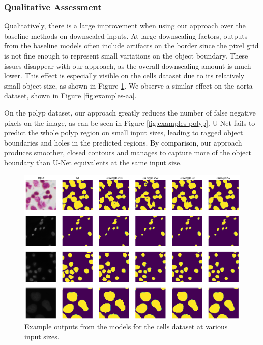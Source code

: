 \FloatBarrier

\subsubsection{Qualitative Assessment}

Qualitatively, there is a large improvement when using our approach over the baseline methods on downscaled inputs. At large downscaling factors, outputs from the baseline models often include artifacts on the border since the pixel grid is not fine enough to represent small variations on the object boundary. These issues disappear with our approach, as the overall downscaling amount is much lower. This effect is especially visible on the cells dataset due to its relatively small object size, as shown in Figure \ref{fig:examples-cells}. We observe a similar effect on the aorta dataset, shown in Figure \ref{fig:examples-aa}.

On the polyp dataset, our approach greatly reduces the number of false negative pixels on the image, as can be seen in Figure \ref{fig:examples-polyp}. U-Net fails to predict the whole polyp region on small input sizes, leading to ragged object boundaries and holes in the predicted regions. By comparison, our approach produces smoother, closed contours and manages to capture more of the object boundary than U-Net equivalents at the same input size.

\begin{figure}[b!]
	\includegraphics[width=\textwidth]{images/5/output_examples_cells.png}
	\caption{Example outputs from the models for the cells dataset at various input sizes. \cite{bencevicSegmentthenSegmentContextPreservingCropBased2023a}\label{fig:examples-cells}}
\end{figure}


